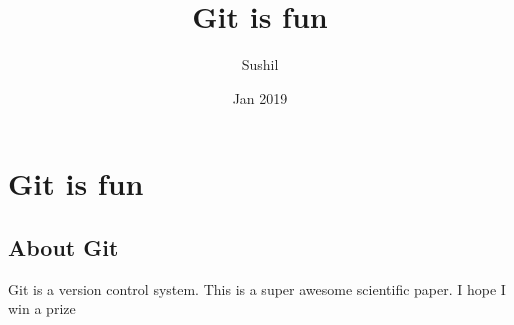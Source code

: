 \documentclass{article}
\title{Git is fun}
\author{Sushil}
\date{Jan 2019}
\begin{document}
\section{Git is fun}
\subsection{About Git}
        Git is a version control system.
        This is a super awesome scientific paper.
        I hope I win a prize
\end{document}
